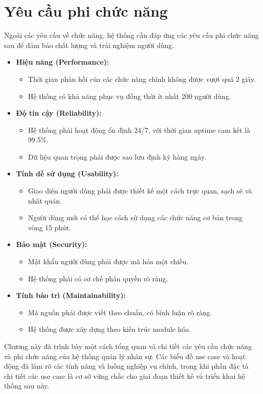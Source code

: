 \documentclass[../DoAn.tex]{subfiles}
\begin{document}
\section{Yêu cầu phi chức năng}
\label{section:2.4}
Ngoài các yêu cầu về chức năng, hệ thống cần đáp ứng các yêu cầu phi chức năng sau để đảm bảo chất lượng và trải nghiệm người dùng.
\begin{itemize}
    \item \textbf{Hiệu năng (Performance):}
    \begin{itemize}
        \item Thời gian phản hồi của các chức năng chính không được vượt quá 2 giây.
        \item Hệ thống có khả năng phục vụ đồng thời ít nhất 200 người dùng.
    \end{itemize}
    \item \textbf{Độ tin cậy (Reliability):}
    \begin{itemize}
        \item Hệ thống phải hoạt động ổn định 24/7, với thời gian uptime cam kết là 99.5\%.
        \item Dữ liệu quan trọng phải được sao lưu định kỳ hàng ngày.
    \end{itemize}
    \item \textbf{Tính dễ sử dụng (Usability):}
    \begin{itemize}
        \item Giao diện người dùng phải được thiết kế một cách trực quan, sạch sẽ và nhất quán.
        \item Người dùng mới có thể học cách sử dụng các chức năng cơ bản trong vòng 15 phút.
    \end{itemize}
    \item \textbf{Bảo mật (Security):}
    \begin{itemize}
        \item Mật khẩu người dùng phải được mã hóa một chiều.
        \item Hệ thống phải có cơ chế phân quyền rõ ràng.
    \end{itemize}
    \item \textbf{Tính bảo trì (Maintainability):}
    \begin{itemize}
        \item Mã nguồn phải được viết theo chuẩn, có bình luận rõ ràng.
        \item Hệ thống được xây dựng theo kiến trúc module hóa.
    \end{itemize}
\end{itemize}

Chương này đã trình bày một cách tổng quan và chi tiết các yêu cầu chức năng và phi chức năng của hệ thống quản lý nhân sự. Các biểu đồ use case và hoạt động đã làm rõ các tính năng và luồng nghiệp vụ chính, trong khi phần đặc tả chi tiết các use case là cơ sở vững chắc cho giai đoạn thiết kế và triển khai hệ thống sau này.
\end{document}
